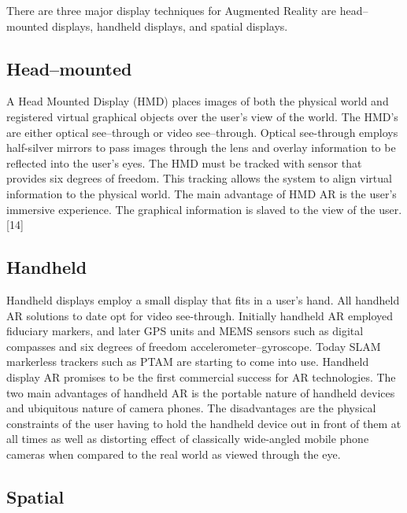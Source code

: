 There are three major display techniques for Augmented Reality are head–mounted displays, handheld displays, and spatial displays.

\subsection{Head–mounted}

A Head Mounted Display (HMD) places images of both the physical world and registered virtual graphical objects over the user's view of the world. The HMD's are either optical see–through or video see–through. Optical see-through employs half-silver mirrors to pass images through the lens and overlay information to be reflected into the user's eyes. The HMD must be tracked with sensor that provides six degrees of freedom. This tracking allows the system to align virtual information to the physical world. The main advantage of HMD AR is the user's immersive experience. The graphical information is slaved to the view of the user.[14]

\subsection{Handheld} 

Handheld displays employ a small display that fits in a user's hand. All handheld AR solutions to date opt for video see-through. Initially handheld AR employed fiduciary markers, and later GPS units and MEMS sensors such as digital compasses and six degrees of freedom accelerometer–gyroscope. Today SLAM markerless trackers such as PTAM are starting to come into use. Handheld display AR promises to be the first commercial success for AR technologies. The two main advantages of handheld AR is the portable nature of handheld devices and ubiquitous nature of camera phones. The disadvantages are the physical constraints of the user having to hold the handheld device out in front of them at all times as well as distorting effect of classically wide-angled mobile phone cameras when compared to the real world as viewed through the eye. 

\subsection{Spatial}

